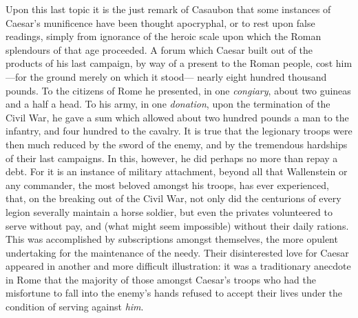 Upon this last topic it is the just remark of Casaubon that some
instances of Caesar's munificence have been thought apocryphal, or to
rest upon false readings, simply from ignorance of the heroic scale upon
which the Roman splendours of that age proceeded. A forum which Caesar
built out of the products of his last campaign, by way of a present to
the Roman people, cost him—for the ground merely on which it stood—
nearly eight hundred thousand pounds. To the citizens of Rome he
presented, in one \emph{congiary}, about two guineas and a half a head. To
his army, in one \emph{donation}, upon the termination of the Civil War, he
gave a sum which allowed about two hundred pounds a man to the infantry,
and four hundred to the cavalry. It is true that the legionary troops
were then much reduced by the sword of the enemy, and by the tremendous
hardships of their last campaigns. In this, however, he did perhaps no
more than repay a debt. For it is an instance of military attachment,
beyond all that Wallenstein or any commander, the most beloved amongst
his troops, has ever experienced, that, on the breaking out of the Civil
War, not only did the centurions of every legion severally maintain a
horse soldier, but even the privates volunteered to serve without pay,
and (what might seem impossible) without their daily rations. This was
accomplished by subscriptions amongst themselves, the more opulent
undertaking for the maintenance of the needy. Their disinterested love
for Caesar appeared in another and more difficult illustration: it was a
traditionary anecdote in Rome that the majority of those amongst
Caesar's troops who had the misfortune to fall into the enemy's hands
refused to accept their lives under the condition of serving against
\emph{him}.

